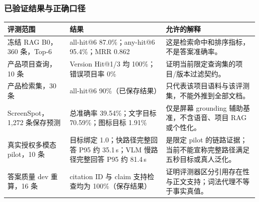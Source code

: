 \documentclass[UTF8,12pt]{ctexart}
\begin{document}



\subsubsection{已验证结果与正确口径}
\begin{center}
\scriptsize
\begin{tabularx}{\textwidth}{>{\raggedright\arraybackslash}p{}
  >{\centering\arraybackslash}p{}
  >{\raggedright\arraybackslash}X}
\toprule
评测范围 & 结果 & 允许的解释\\
\midrule
冻结 RAG B0，360 条，Top-6 & all-hit@6 87.0\%；any-hit@6 95.4\%；MRR 0.862 & 这是检索命中和排序指标，不是答案准确率。\\
产品项目查询，10 条 & Version Hit@1/3 均 100\%；错误项目率 0\% & 证明当前限定查询集的项目/版本过滤契约。\\
产品检索集，30 条 & all-hit@6 90\%（已保存结果） & 只代表该项目语料与该评测集，不能外推到全部文档。\\
ScreenSpot，1,272 条保存预测 & 总准确率 39.54\%；文字目标 70.59\%；图标目标 1.91\% & 仅是屏幕 grounding 辅助基准，不含语音、项目 RAG 或个性化。\\
真实授权多模态 pilot，10 条 & 目标绑定 1.0；快路径完整回答 P95 约 35.1\,s；VLM 慢路径完整回答 P95 约 81.4\,s & 是限定 pilot 的链路证据；当前不能宣称完整路径满足五秒目标或真人泛化。\\
答案质量 dev 重算，16 条 & citation ID 与 claim 支持检查均为 100\%（保存结果） & 证明评测器区分引用存在性与正文支持；词法代理不等于事实真值。\\
\bottomrule
\end{tabularx}
\end{center}
\end{document}
